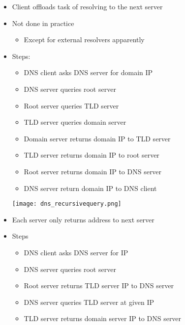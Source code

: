 \begin{itemize}
\begin{itemize}
\begin{itemize}
                    \item Client offloads task of resolving to the next server
                    \item Not done in practice
                        \begin{itemize}
                            \item Except for external resolvers apparently
                        \end{itemize}
                    \item Steps:
                        \begin{itemize}
                            \item DNS client asks DNS server for domain IP
                            \item DNS server queries root server
                            \item Root server queries TLD server
                            \item TLD server queries domain server
                            \item Domain server returns domain IP to TLD server
                            \item TLD server returns domain IP to root server
                            \item Root server returns domain IP to DNS server
                            \item DNS server return domain IP to DNS client
                        \end{itemize}
                    \texttt{[image: dns\_recursivequery.png]}
                \end{itemize}
                \begin{itemize}
                    \item Each server only returns address to next server
                    \item Steps
                        \begin{itemize}
                            \item DNS client asks DNS server for IP
                            \item DNS server queries root server
                            \item Root server returns TLD server IP to DNS server
                            \item DNS server queries TLD server at given IP
                            \item TLD server returns domain server IP to DNS server

\end{itemize}
\end{itemize}
\end{itemize}
\end{itemize}
